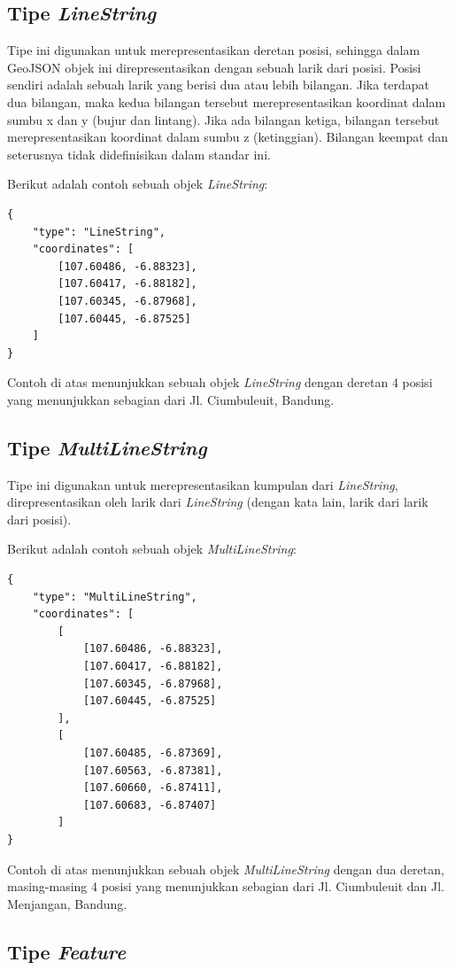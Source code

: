 \subsection{Tipe \textit{LineString}}

Tipe ini digunakan untuk merepresentasikan deretan posisi, sehingga dalam GeoJSON objek ini direpresentasikan dengan sebuah larik dari posisi. Posisi sendiri adalah sebuah larik yang berisi dua atau lebih bilangan. Jika terdapat dua bilangan, maka kedua bilangan tersebut merepresentasikan koordinat dalam sumbu x dan y (bujur dan lintang). Jika ada bilangan ketiga, bilangan tersebut merepresentasikan koordinat dalam sumbu z (ketinggian). Bilangan keempat dan seterusnya tidak didefinisikan dalam standar ini.

Berikut adalah contoh sebuah objek \textit{LineString}:

\begin{lstlisting}
{
	"type": "LineString",
	"coordinates": [
		[107.60486, -6.88323],
		[107.60417, -6.88182],
		[107.60345, -6.87968],
		[107.60445, -6.87525]
	]
}
\end{lstlisting}

Contoh di atas menunjukkan sebuah objek \textit{LineString} dengan deretan 4 posisi yang menunjukkan sebagian dari Jl. Ciumbuleuit, Bandung.

\subsection{Tipe \textit{MultiLineString}}

Tipe ini digunakan untuk merepresentasikan kumpulan dari \textit{LineString}, direpresentasikan oleh larik dari \textit{LineString} (dengan kata lain, larik dari larik dari posisi).

Berikut adalah contoh sebuah objek \textit{MultiLineString}:

\begin{lstlisting}
{
	"type": "MultiLineString",
	"coordinates": [
		[
			[107.60486, -6.88323],
			[107.60417, -6.88182],
			[107.60345, -6.87968],
			[107.60445, -6.87525]
		],
		[
			[107.60485, -6.87369],
			[107.60563, -6.87381],
			[107.60660, -6.87411],
			[107.60683, -6.87407]
		]
}
\end{lstlisting}

Contoh di atas menunjukkan sebuah objek \textit{MultiLineString} dengan dua deretan, masing-masing 4 posisi yang menunjukkan sebagian dari Jl. Ciumbuleuit dan Jl. Menjangan, Bandung.

\subsection{Tipe \textit{Feature}}

